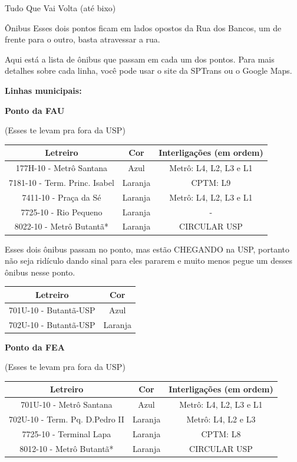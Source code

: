 \begin{secao}{Tudo Que Vai Volta (até bixo)}
\begin{subsecao}{Ônibus}
Esses dois pontos ficam em lados opostos da Rua dos Bancos, um de frente para o
outro, basta atravessar a rua.

Aqui está a lista de ônibus que passam em cada um dos pontos. Para mais detalhes
sobre cada linha, você pode usar o site da SPTrans ou o Google Maps.

{\bf Linhas municipais:}

{\bf Ponto da FAU}

(Esses te levam pra fora da USP)
\begin{center}
	\begin{tabular}{|c|c|c|}
      \hline
	  Letreiro & Cor & Interligações (em ordem)\\
	  \hline
	  177H-10 - Metrô Santana & Azul & Metrô: L4, L2, L3 e L1\\
	  7181-10 - Term. Princ. Isabel & Laranja & CPTM: L9\\
	  7411-10 - Praça da Sé & Laranja & Metrô: L4, L2, L3 e L1\\
	  7725-10 - Rio Pequeno & Laranja & - \\
	  8022-10 - Metrô Butantã* & Laranja & CIRCULAR USP\\
      \hline
	\end{tabular}
\end{center}

Esses dois ônibus passam no ponto, mas estão CHEGANDO na USP, portanto não seja
ridículo dando sinal para eles pararem e muito menos pegue um desses ônibus
nesse ponto.

\begin{center}
	\begin{tabular}{|c|c|}
	  \hline
	  Letreiro & Cor\\
	  \hline
	  701U-10 - Butantã-USP & Azul\\
	  702U-10 - Butantã-USP & Laranja\\
	  \hline
	\end{tabular}
\end{center}

{\bf Ponto da FEA}

(Esses te levam pra fora da USP)
\begin{center}
	\begin{tabular}{|c|c|c|}
      \hline
	  Letreiro & Cor & Interligações (em ordem)\\
	  \hline
	  701U-10 - Metrô Santana & Azul & Metrô: L4, L2, L3 e L1\\
	  702U-10 - Term. Pq. D.Pedro II & Laranja & Metrô: L4, L2 e L3\\
	  7725-10 - Terminal Lapa & Laranja & CPTM: L8\\
	  8012-10 - Metrô Butantã* & Laranja & CIRCULAR USP\\
      \hline
	\end{tabular}
\end{center}


\end{subsecao}
\end{secao}
